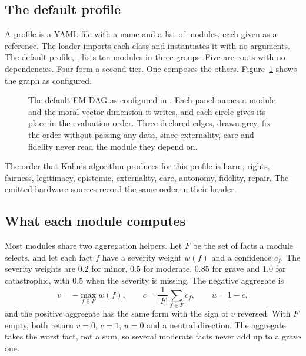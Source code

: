 \subsection{The default profile}

A profile is a YAML file with a name and a list of modules, each given as a
 reference. The loader imports each class and instantiates it with no
arguments. The default profile, , lists ten modules in three groups.
Five are roots with no dependencies. Four form a second tier. One composes the others.
Figure~\ref{fig:compiler-emdag} shows the graph as configured.

\begin{figure}[t]
\centering

\caption{The default EM-DAG as configured in . Each panel names a module and
the moral-vector dimension it writes, and each circle gives its place in the evaluation order. Three
declared edges, drawn grey, fix the order without passing any data, since externality, care and
fidelity never read the module they depend on.}
\label{fig:compiler-emdag}
\end{figure}

The order that Kahn's algorithm produces for this profile is harm, rights, fairness, legitimacy,
epistemic, externality, care, autonomy, fidelity, repair. The emitted hardware sources record the
same order in their header.

\subsection{What each module computes}

Most modules share two aggregation helpers. Let $F$ be the set of facts a module selects, and let
each fact $f$ have a severity weight $w(f)$ and a confidence $c_f$. The severity weights are
$0.2$ for minor, $0.5$ for moderate, $0.85$ for grave and $1.0$ for catastrophic, with $0.5$ when
the severity is missing. The negative aggregate is
\begin{equation}
v = -\max_{f \in F} w(f), \qquad c = \frac{1}{|F|}\sum_{f \in F} c_f, \qquad u = 1 - c,
\label{eq:compiler-aggneg}
\end{equation}
and the positive aggregate has the same form with the sign of $v$ reversed. With $F$ empty, both
return $v = 0$, $c = 1$, $u = 0$ and a neutral direction. The aggregate takes the worst fact, not
a sum, so several moderate facts never add up to a grave one.

